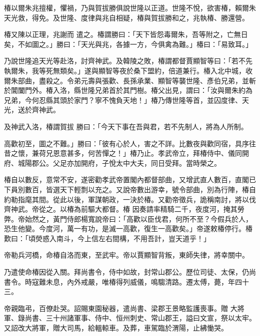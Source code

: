 \begin{pinyinscope}
 椿以爾朱兆擅權，懼禍，乃與賀拔勝俱說世隆以正道。世隆不悅，欲害椿，賴爾朱天光救，得免。及世隆、度律與兆自相疑，椿與賀拔勝和之，兆執椿、勝還營。



 椿又陳以正理，兆謝而
 遣之。椿謂勝曰：「天下皆怨毒爾朱，吾等附之，亡無日矣，不如圖之。」勝曰：「天光與兆，各據一方，今俱禽為難。」椿曰：「易致耳。」



 乃說世隆追天光等赴洛，討齊神武。及韓陵之敗，椿謂都督賈顯智等曰：「若不先執爾朱，我等死無類矣。」遂與顯智等夜於桑下盟約，倍道兼行。椿入北中城，收爾朱部曲，盡殺之。令弟元壽與張歡、長孫承業、顯智等襲世隆、彥伯兄弟，並斬於閶闔門外。椿入洛，縣世隆兄弟首於其門樹。椿父出見，謂曰：「汝與爾朱約為兄弟，今何忍縣其頭於家門？寧不愧負天地！」椿乃傳世隆等首，並囚度律、天光，送於齊神武。



 及神武入洛，椿謂賀拔
 勝曰：「今天下事在吾與君，若不先制人，將為人所制。



 高歡初至，圖之不難。」勝曰：「彼有心於人，害之不詳。比數夜與歡同宿，具序往昔之懷，兼荷兄恩意甚多，何苦憚之！」椿乃止。孝武帝立，拜椿侍中、儀同開府、城陽郡公。父足亦加開府，子悅太中大夫，同日受拜。當時榮之。



 椿自以數反，意常不安，遂密勸孝武帝置閣內都督部曲，又增武直人數百，直閣已下員別數百，皆選天下輕剽以充之。又說帝數出游幸，號令部曲，別為行陣，椿自約勒指麾其間。從此以後，軍謀朝政，一決於椿。又勸帝徵兵，詭稱南討，將以伐齊神武。帝從之。以椿為前驅大都督。椿
 因奏請率精騎二千，夜度河，掩其勞弊。帝始然之，黃門侍郎楊寬說帝曰：「高歡以臣伐君，何所不至？今假兵於人，恐生他變。今度河，萬一有功，是滅一高歡，復生一高歡矣。」帝遂敕椿停行。椿歎曰：「頃熒惑入南斗，今上信左右間構，不用吾計，豈天道乎！」



 帝勒兵河橋，命椿自洛而東，至武牢。帝以賈顯智背叛，東師失律，將幸關中。



 乃遣使命椿因從入關。拜尚書令，侍中如故，封常山郡公。歷位司徒、太保，仍尚書令。時寇難未息，內外戒嚴，唯椿得列威儀，鳴騶清路。遷太傅，薨，年四十三。



 帝親臨弔，百僚赴哭。詔賜東園秘器，遣尚書、梁郡王景略監護喪事。贈
 大將軍、錄尚書、三十州諸軍事、侍中、恒州刺史、常山郡王，謚曰文宣，祭以太牢。又詔改大將軍，贈大司馬，給轀輬車。及葬，車駕臨於渭陽，止紼慟哭。




\end{pinyinscope}
